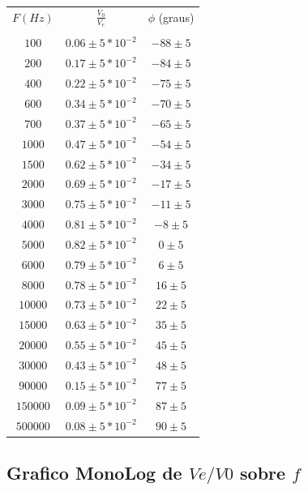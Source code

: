 \documentclass[12pt,twoside, a4paper, twocolumn]{article}
\begin{document}
\begin{center}
  \begin{tabular}{ |c|c|c| }
    \hline
    $F (Hz)$ & $ \frac{V_0}{V_e}$     & $\phi$ (graus) \\
             &                        &                \\
    $100$    & $0.06 \pm 5 * 10^{-2}$ & $-88 \pm 5$    \\
    $200$    & $0.17 \pm 5 * 10^{-2}$ & $-84 \pm 5$    \\
    $400$    & $0.22 \pm 5 * 10^{-2}$ & $-75 \pm 5$    \\
    $600$    & $0.34 \pm 5 * 10^{-2}$ & $-70 \pm 5$    \\
    $700$    & $0.37 \pm 5 * 10^{-2}$ & $-65 \pm 5$    \\
    $1000$   & $0.47 \pm 5 * 10^{-2}$ & $-54 \pm 5$    \\
    $1500$   & $0.62 \pm 5 * 10^{-2}$ & $-34 \pm 5$    \\
    $2000$   & $0.69 \pm 5 * 10^{-2}$ & $-17 \pm 5$    \\
    $3000$   & $0.75 \pm 5 * 10^{-2}$ & $-11 \pm 5$    \\
    $4000$   & $0.81 \pm 5 * 10^{-2}$ & $-8 \pm 5$     \\
    $5000$   & $0.82 \pm 5 * 10^{-2}$ & $0 \pm 5$      \\
    $6000$   & $0.79 \pm 5 * 10^{-2}$ & $6 \pm 5$      \\
    $8000$   & $0.78 \pm 5 * 10^{-2}$ & $16 \pm 5$     \\
    $10000$  & $0.73 \pm 5 * 10^{-2}$ & $22 \pm 5$     \\
    $15000$  & $0.63 \pm 5 * 10^{-2}$ & $35 \pm 5$     \\
    $20000$  & $0.55 \pm 5 * 10^{-2}$ & $45 \pm 5$     \\
    $30000$  & $0.43 \pm 5 * 10^{-2}$ & $48 \pm 5$     \\
    $90000$  & $0.15 \pm 5 * 10^{-2}$ & $77 \pm 5$     \\
    $150000$ & $0.09 \pm 5 * 10^{-2}$ & $87 \pm 5$     \\
    $500000$ & $0.08 \pm 5 * 10^{-2}$ & $90 \pm 5$     \\
    \hline
  \end{tabular}
\end{center}

\subsection{Grafico MonoLog de $Ve/V0$ sobre $f$}
\end{document}
